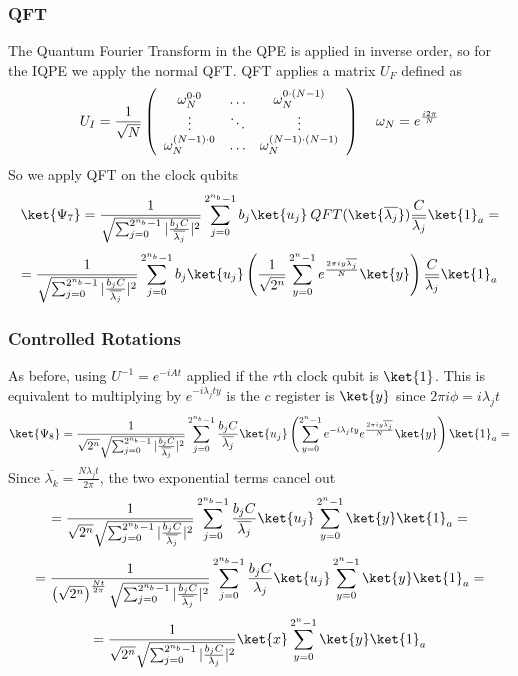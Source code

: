 \documentclass[10pt]{article}
\begin{document}
\subsubsection{QFT}
The Quantum Fourier Transform in the QPE is applied in inverse order, so for the IQPE we apply the normal QFT. QFT applies a matrix $U_F$ defined as
$$U_I=\frac{1}{\sqrt{N}}\left(
	\begin{array}{c c c}
		\omega_N^{0\cdot 0}&\ldots&\omega_N^{0\cdot (N-1)}\\
		\vdots&\ddots&\vdots\\
		\omega_N^{(N-1)\cdot 0}&\ldots&\omega_N^{(N-1)\cdot(N-1)}
	\end{array}
\right)\:\:\:\:\:\omega_N=e^{\frac{i2\pi}{N}}$$
So we apply QFT on the clock qubits
$$\ket{\Psi_7}=\frac{1}{ \sqrt{\sum_{j=0}^{2^{n_b}-1}|\frac{b_jC}{\overline{\lambda_j}}|^2}}\sum_{j=0}^{2^{n_b}-1}b_j\ket{u_j}\:QFT(\ket{\overline{\lambda_j}})\frac{C}{\overline{\lambda_j}}\ket{1}_a=$$
$$=\frac{1}{ \sqrt{\sum_{j=0}^{2^{n_b}-1}|\frac{b_jC}{\overline{\lambda_j}}|^2}}\sum_{j=0}^{2^{n_b}-1}b_j\ket{u_j}\left(\frac{1}{\sqrt{2^n}}\sum_{y=0}^{2^n-1}e^{\frac{2\pi iy\overline{\lambda_j}}{N}}\ket{y}\right)\frac{C}{\overline{\lambda_j}}\ket{1}_a$$
\subsubsection{Controlled Rotations}
As before, using $U^{-1}=e^{-iAt}$ applied if the $r$th clock qubit is $\ket{1}$. This is equivalent to multiplying by $e^{-i\lambda_jty}$ is the $c$ register is $\ket{y}$ since $2\pi i\phi=i\lambda_j t$
$$\ket{\Psi_8}=\frac{1}{\sqrt{2^n}\sqrt{\sum_{j=0}^{2^{n_b}-1}|\frac{b_jC}{\overline{\lambda_j}}|^2}}\sum_{j=0}^{2^{n_b}-1}\frac{b_jC}{\overline{\lambda_j}}\ket{u_j}\left(\sum_{y=0}^{2^n-1}e^{-i\lambda_jty}e^{\frac{2\pi iy\overline{\lambda_j}}{N}}\ket{y}\right)\ket{1}_a=$$
Since $\overline{\lambda_k}=\frac{N\lambda_j t}{2\pi}$, the two exponential terms cancel out
$$=\frac{1}{\sqrt{2^n} \sqrt{\sum_{j=0}^{2^{n_b}-1}|\frac{b_jC}{\overline{\lambda_j}}|^2}}\sum_{j=0}^{2^{n_b}-1}\frac{b_jC}{\overline{\lambda_j}}\ket{u_j}\sum_{y=0}^{2^n-1}\ket{y}\ket{1}_a=$$
$$=\frac{1}{\left(\sqrt{2^n}\right)^{\frac{Nt}{2\pi}} \sqrt{\sum_{j=0}^{2^{n_b}-1}|\frac{b_jC}{\overline{\lambda_j}}|^2}}\sum_{j=0}^{2^{n_b}-1}\frac{b_jC}{\lambda_j}\ket{u_j}\sum_{y=0}^{2^n-1}\ket{y}\ket{1}_a=$$
$$=\frac{1}{\sqrt{2^n} \sqrt{\sum_{j=0}^{2^{n_b}-1}|\frac{b_jC}{\lambda_j}|^2}}\ket{x}\sum_{y=0}^{2^n-1}\ket{y}\ket{1}_a$$
\end{document}
